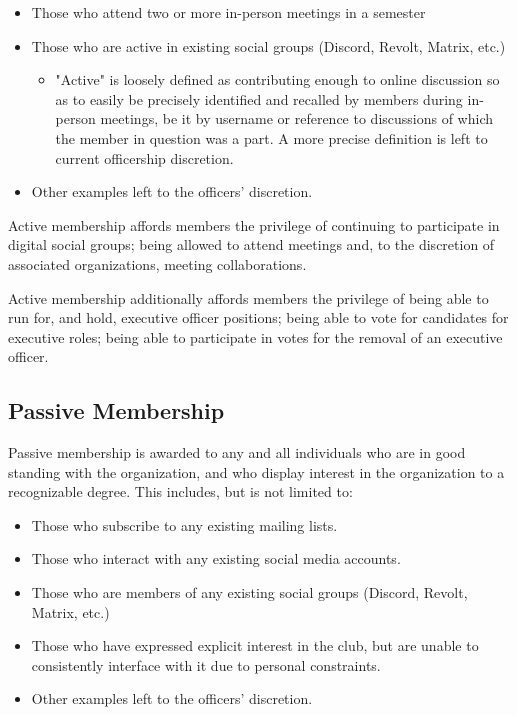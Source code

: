 \documentclass[12pt,letterpaper]{article}
\begin{document}
\begin{itemize}
  \item Those who attend two or more in-person meetings in a semester
  \item Those who are active in existing social groups (Discord, Revolt, Matrix, etc.)
    \begin{itemize}
      \item "Active" is loosely defined as contributing enough to online discussion so as
        to easily be precisely identified and recalled by members during in-person
        meetings, be it by username or reference to discussions of which the member in
        question was a part. A more precise definition is left to current officership
        discretion.
    \end{itemize}
  \item Other examples left to the officers' discretion.
\end{itemize}

Active membership affords members the privilege of continuing to participate in digital
social groups; being allowed to attend meetings and, to the discretion of associated
organizations, meeting collaborations.

Active membership additionally affords members the privilege of being able to run for,
and hold, executive officer positions; being able to vote for candidates for executive
roles; being able to participate in votes for the removal of an executive officer.

\subsection{Passive Membership}

Passive membership is awarded to any and all individuals who are in good standing
with the organization, and who display interest in the organization to a recognizable
degree. This includes, but is not limited to:

\begin{itemize}
  \item Those who subscribe to any existing mailing lists.
  \item Those who interact with any existing social media accounts.
  \item Those who are members of any existing social groups (Discord, Revolt, Matrix, etc.)
  \item Those who have expressed explicit interest in the club, but are unable to
    consistently interface with it due to personal constraints.
  \item Other examples left to the officers' discretion.
\end{itemize}
\end{document}
